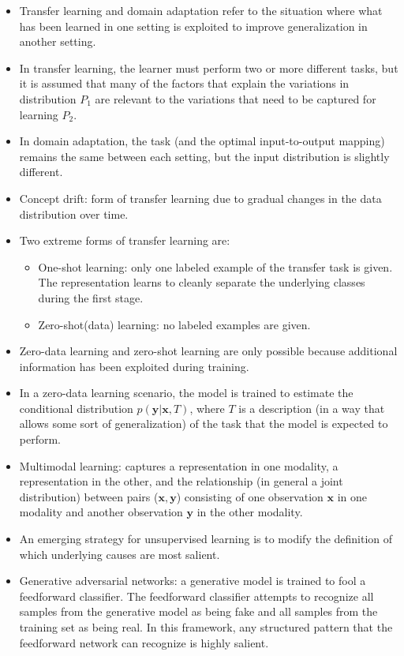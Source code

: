 \documentclass{article}
\begin{document}
\begin{itemize}
\item Transfer learning and domain adaptation refer to the situation where what has been learned in one setting is exploited to improve generalization in another setting.
\item In transfer learning, the learner must perform two or more different tasks, but it is assumed that many of the factors that explain the variations in distribution \(P_1\) are relevant to the variations that need to be captured for learning \(P_2\).
\item In domain adaptation, the task (and the optimal input-to-output mapping) remains the same between each setting, but the input distribution is slightly different.
\item Concept drift: form of transfer learning due to gradual changes in the data distribution over time.
\item Two extreme forms of transfer learning are:
\begin{itemize}
\item One-shot learning: only one labeled example of the transfer task is given. The representation learns to cleanly separate the underlying classes during the first stage.
\item Zero-shot(data) learning: no labeled examples are given.
\end{itemize}
\item Zero-data learning and zero-shot learning are only possible because additional information has been exploited during training.
\item In a zero-data learning scenario, the model is trained to estimate the conditional distribution \(p(\boldsymbol{y}|\boldsymbol{x}, T)\), where \(T\) is a description (in a way that allows some sort of generalization) of the task that the model is expected to perform.
\item Multimodal learning: captures a representation in one modality, a representation in the other, and the relationship (in general a joint distribution) between pairs (\(\boldsymbol{x},\boldsymbol{y}\)) consisting of one observation \(\boldsymbol{x}\) in one modality and another observation \(\boldsymbol{y}\) in the other modality.
\item An emerging strategy for unsupervised learning is to modify the definition of which underlying causes are most salient.
\item Generative adversarial networks: a generative model is trained to fool a feedforward classifier. The feedforward classifier attempts to recognize all samples from the generative model as being fake and all samples from the training set as being real. In this framework, any structured pattern that the feedforward network can recognize is highly salient.

\end{itemize}
\end{document}
